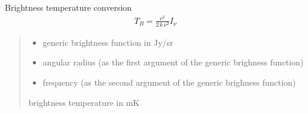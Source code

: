 \documentclass[letterpaper,10pt,english]{sphinxmanual}
\begin{document}
\begin{fulllineitems}
\label{\detokenize{diffsph.utils:diffsph.utils.tools.TB}}
\pysigstartsignatures
{}
\pysigstopsignatures
\sphinxAtStartPar
Brightness temperature conversion
\begin{equation*}
\begin{split}T_B = \frac{c^2}{2\,k\,\nu^2}I_\nu\end{split}
\end{equation*}\begin{quote}\begin{description}
\begin{itemize}
\item {} 
\sphinxAtStartPar
{} \textendash{} generic brightness function in Jy/sr

\item {} 
\sphinxAtStartPar
{} \textendash{} angular radius (as the first argument of the generic brighness function)

\item {} 
\sphinxAtStartPar
{} \textendash{} frequency (as the second argument of the generic brighness function)

\end{itemize}

\sphinxAtStartPar
brightness temperature in mK

\end{description}\end{quote}

\end{fulllineitems}

\end{document}
